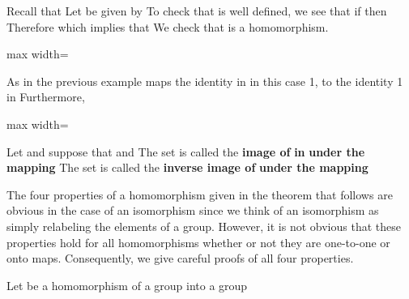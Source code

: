 \documentclass[11pt,oneside]{article}
\begin{document}
\begin{BookBody}

 Recall that  Let  be given by  To check that \BookInline{\phi } is well defined, we see that if  then  Therefore which implies that  We check that \BookInline{\phi } is a homomorphism.

\begin{center}\begin{adjustbox}{max width=\linewidth}\end{adjustbox}\end{center}

\noindent As in the previous example\BookInline{,\allowbreak \phi } maps the identity in  in this case 1, to the identity 1 in  Furthermore,

\begin{center}\begin{adjustbox}{max width=\linewidth}\end{adjustbox}\end{center} \BookEnd{\blacktriangle}

 Let  and suppose that  and  The set  is called the\textbf{ image of}  \textbf{in}  \textbf{under the mapping}  The set  is called the\textbf{ inverse image of}  \textbf{under the mapping} \BookEnd{\blacksquare}

\noindent The four properties of a homomorphism given in the theorem that follows are obvious in the case of an isomorphism since we think of an isomorphism as simply relabeling the elements of a group. However, it is not obvious that these properties hold for all homomorphisms whether or not they are one-to-one or onto maps. Consequently, we give careful proofs of all four properties.

 Let \BookInline{\phi } be a homomorphism of a group  into a group 


\end{BookBody}
\end{document}
